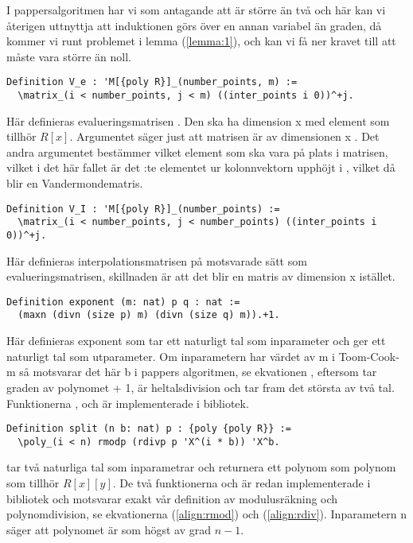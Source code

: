 I pappersalgoritmen har vi som antagande att  är större än två och här kan
vi återigen uttnyttja att induktionen görs över en annan variabel än graden, då
kommer vi runt problemet i lemma (\ref{lemma:1}), och kan vi få ner kravet till
att  måste vara större än noll.

\begin{lstlisting}
Definition V_e : 'M[{poly R}]_(number_points, m) :=
  \matrix_(i < number_points, j < m) ((inter_points i 0))^+j.
\end{lstlisting}

Här definieras evalueringsmatrisen . Den ska ha dimension
 x  med element som tillhör $R[x]$. Argumentet  säger just att matrisen är av dimensionen
 x . Det andra argumentet 
bestämmer vilket element som ska vara på plats  i matrisen, vilket i
det här fallet är det :te elementet ur kolonnvektorn 
upphöjt i , vilket då blir en Vandermondematris.

\begin{lstlisting}
Definition V_I : 'M[{poly R}]_(number_points) :=
  \matrix_(i < number_points, j < number_points) ((inter_points i 0))^+j.
\end{lstlisting}

Här definieras interpolationsmatrisen på motsvarade sätt som
evalueringsmatrisen, skillnaden är att det blir en matris av dimension
 x  istället.

\begin{lstlisting}
Definition exponent (m: nat) p q : nat :=
  (maxn (divn (size p) m) (divn (size q) m)).+1.
\end{lstlisting}

Här definieras exponent som tar ett naturligt tal  som inparameter och ger
ett naturligt tal som utparameter. Om inparametern har värdet av m i
Toom-Cook-m så motsvarar det här b i pappers algoritmen, se ekvationen ,
eftersom  tar graden av polynomet + 1,  är heltalsdivision och
 tar fram det största av två tal. Funktionerna ,  och
 är implementerade i \ssr bibliotek.

\begin{lstlisting}
Definition split (n b: nat) p : {poly {poly R}} :=
  \poly_(i < n) rmodp (rdivp p 'X^(i * b)) 'X^b.
\end{lstlisting}

 tar två naturliga tal som inparametrar och returnera ett polynom som
polynom som tillhör $R[x][y]$. De två funktionerna  och  är
redan implementerade i \ssr bibliotek och motsvarar exakt vår definition
av modulusräkning och polynomdivision, se ekvationerna (\ref{align:rmod}) och
(\ref{align:rdiv}). Inparametern n säger att polynomet är som högst av grad
$n-1$.

